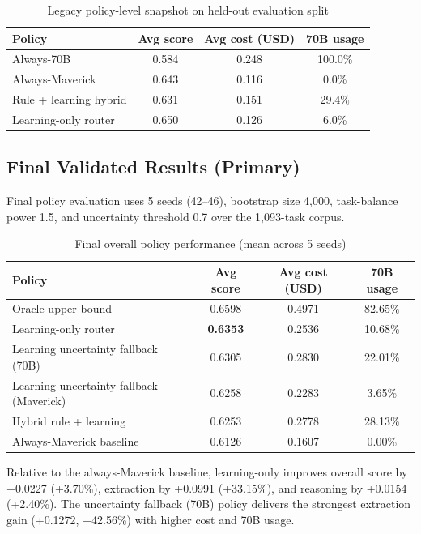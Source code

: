 \begin{table}[H]
\centering
\caption{Legacy policy-level snapshot on held-out evaluation split}
\begin{tabular}{lccc}
\toprule
Policy & Avg score & Avg cost (USD) & 70B usage \\
\midrule
Always-70B & 0.584 & 0.248 & 100.0\% \\
Always-Maverick & 0.643 & 0.116 & 0.0\% \\
Rule + learning hybrid & 0.631 & 0.151 & 29.4\% \\
Learning-only router & 0.650 & 0.126 & 6.0\% \\
\bottomrule
\end{tabular}
\end{table}

\subsection{Final Validated Results (Primary)}
Final policy evaluation uses 5 seeds (42--46), bootstrap size 4,000, task-balance power 1.5, and uncertainty threshold 0.7 over the 1,093-task corpus.

\begin{table}[H]
\centering
\caption{Final overall policy performance (mean across 5 seeds)}
\begin{tabular}{lccc}
\toprule
Policy & Avg score & Avg cost (USD) & 70B usage \\
\midrule
Oracle upper bound & 0.6598 & 0.4971 & 82.65\% \\
Learning-only router & \textbf{0.6353} & 0.2536 & 10.68\% \\
Learning uncertainty fallback (70B) & 0.6305 & 0.2830 & 22.01\% \\
Learning uncertainty fallback (Maverick) & 0.6258 & 0.2283 & 3.65\% \\
Hybrid rule + learning & 0.6253 & 0.2778 & 28.13\% \\
Always-Maverick baseline & 0.6126 & 0.1607 & 0.00\% \\
\bottomrule
\end{tabular}
\end{table}

Relative to the always-Maverick baseline, learning-only improves overall score by +0.0227 (+3.70\%), extraction by +0.0991 (+33.15\%), and reasoning by +0.0154 (+2.40\%). The uncertainty fallback (70B) policy delivers the strongest extraction gain (+0.1272, +42.56\%) with higher cost and 70B usage.


